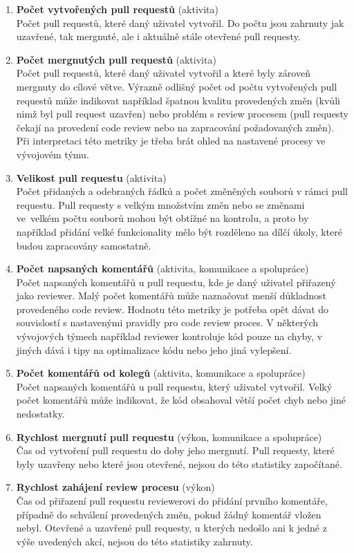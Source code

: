\begin{enumerate}
    \item \textbf{Počet vytvořených pull requestů} (aktivita)\\
    Počet pull requestů, které daný uživatel vytvořil. Do počtu jsou zahrnuty jak uzavřené, tak mergnuté, ale i aktuálně stále otevřené pull requesty.
    \item \textbf{Počet mergnutých pull requestů} (aktivita)\\
    Počet pull requestů, které daný uživatel vytvořil a které byly zároveň mergnuty do cílové větve. Výrazně odlišný počet od počtu vytvořených pull requestů může indikovat například špatnou kvalitu provedených změn (kvůli nimž byl pull request uzavřen) nebo problém s review procesem (pull requesty čekají na provedení code review nebo na zapracování požadovaných změn). Při interpretaci této metriky je třeba brát ohled na nastavené procesy ve vývojovém týmu.
    \item \textbf{Velikost pull requestu} (aktivita)\\
    Počet přidaných a odebraných řádků a počet změněných souborů v rámci pull requestu. Pull requesty s velkým množstvím změn nebo se změnami ve~velkém počtu souborů mohou být obtížné na kontrolu, a proto by například přidání velké funkcionality mělo být rozděleno na dílčí úkoly, které budou zapracovány samostatně.
    \item \textbf{Počet napsaných komentářů} (aktivita, komunikace a spolupráce)\\
    Počet napsaných komentářů u pull requestu, kde je daný uživatel přiřazený jako reviewer. Malý počet komentářů může naznačovat menší důkladnost provedeného code review. Hodnotu této metriky je potřeba opět dávat do souvislostí s nastavenými pravidly pro code review proces. V některých vývojových týmech například reviewer kontroluje kód pouze na chyby, v jiných dává i tipy na optimalizace kódu nebo jeho jiná vylepšení.
    \item \textbf{Počet komentářů od kolegů} (aktivita, komunikace a spolupráce)\\
    Počet napsaných komentářů u pull requestu, který uživatel vytvořil. Velký počet komentářů může indikovat, že kód obsahoval větší počet chyb nebo jiné nedostatky.
    \item \textbf{Rychlost mergnutí pull requestu} (výkon, komunikace a spolupráce)\\
    Čas od vytvoření pull requestu do doby jeho mergnutí. Pull requesty, které byly uzavřeny nebo které jsou otevřené, nejsou do této statistiky započítané.
    \item \textbf{Rychlost zahájení review procesu} (výkon)\\
    Čas od přiřazení pull requestu reviewerovi do přidání prvního komentáře, případně do schválení provedených změn, pokud žádný komentář vložen nebyl. Otevřené a uzavřené pull requesty, u kterých nedošlo ani k jedné z výše uvedených akcí, nejsou do této statistiky zahrnuty.
\end{enumerate}

